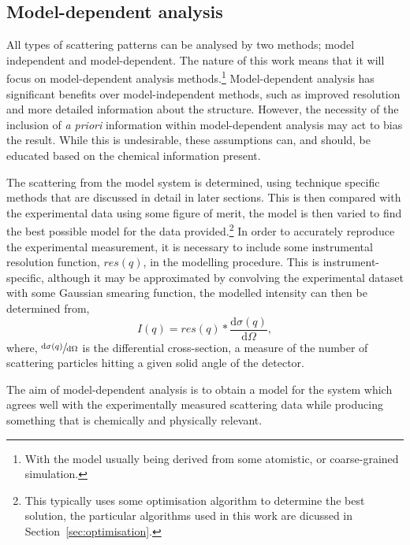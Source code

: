 \subsection{Model-dependent analysis}
\label{sec:moddep}
All types of scattering patterns can be analysed by two methods; model independent and model-dependent.
The nature of this work means that it will focus on model-dependent analysis methods.\footnote{With the model usually being derived from some atomistic, or coarse-grained simulation.}
Model-dependent analysis has significant benefits over model-independent methods, such as improved resolution and more detailed information about the structure.
However, the necessity of the inclusion of \emph{a priori} information within model-dependent analysis may act to bias the result.
While this is undesirable, these assumptions can, and should, be educated based on the chemical information present.\autocite[][such as the propensity for twin-tailed phospholipid molecules to form monolayers at an air-water interface or small surfactants to form micelles in solution.]{mccluskey_model-dependent_2018}

The scattering from the model system is determined, using technique specific methods that are discussed in detail in later sections.
This is then compared with the experimental data using some figure of merit, the model is then varied to find the best possible model for the data provided.\footnote{This typically uses some optimisation algorithm to determine the best solution, the particular algorithms used in this work are dicussed in Section~\ref{sec:optimisation}.}
In order to accurately reproduce the experimental measurement, it is necessary to include some instrumental resolution function, $res(q)$, in the modelling procedure.
This is instrument-specific, although it may be approximated by convolving the experimental dataset with some Gaussian smearing function, the modelled intensity can then be determined from,\autocite{nelson_towards_2013-1,nelson_towards_2014}
%
\begin{equation}
    I(q) = res(q) * \frac{\text{d}\sigma(q)}{\text{d}\Omega},
\end{equation}
%
where, $\sfrac{\text{d}\sigma(q)}{\text{d}\Omega}$ is the differential cross-section, a measure of the number of scattering particles hitting a given solid angle of the detector.

The aim of model-dependent analysis is to obtain a model for the system which agrees well with the experimentally measured scattering data while producing something that is chemically and physically relevant.


